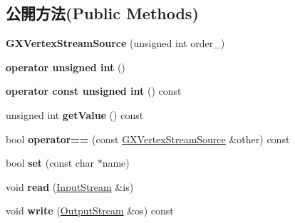\subsection*{公開方法(Public Methods)}
\begin{DoxyCompactItemize}
\item 
{\bfseries G\+X\+Vertex\+Stream\+Source} (unsigned int order\+\_)\hypertarget{class_magnum_1_1_g_x_vertex_stream_source_ad21b3ffb138bf24db534fdd1b831a24e}{}\label{class_magnum_1_1_g_x_vertex_stream_source_ad21b3ffb138bf24db534fdd1b831a24e}

\item 
{\bfseries operator unsigned int} ()\hypertarget{class_magnum_1_1_g_x_vertex_stream_source_a2658fb9c66c733eab735d989b8a0a894}{}\label{class_magnum_1_1_g_x_vertex_stream_source_a2658fb9c66c733eab735d989b8a0a894}

\item 
{\bfseries operator const unsigned int} () const \hypertarget{class_magnum_1_1_g_x_vertex_stream_source_ab23dfffabf2ec96f46dc9e8130c306ba}{}\label{class_magnum_1_1_g_x_vertex_stream_source_ab23dfffabf2ec96f46dc9e8130c306ba}

\item 
unsigned int {\bfseries get\+Value} () const \hypertarget{class_magnum_1_1_g_x_vertex_stream_source_a7d88dcc1f49b5e15d79cbe687d5bbf23}{}\label{class_magnum_1_1_g_x_vertex_stream_source_a7d88dcc1f49b5e15d79cbe687d5bbf23}

\item 
bool {\bfseries operator==} (const \hyperlink{class_magnum_1_1_g_x_vertex_stream_source}{G\+X\+Vertex\+Stream\+Source} \&other) const \hypertarget{class_magnum_1_1_g_x_vertex_stream_source_a9158cc4f04e6cf822fc730899ea591b3}{}\label{class_magnum_1_1_g_x_vertex_stream_source_a9158cc4f04e6cf822fc730899ea591b3}

\item 
bool {\bfseries set} (const char $\ast$name)\hypertarget{class_magnum_1_1_g_x_vertex_stream_source_aaea53f5be155c0e95987893ac47270f3}{}\label{class_magnum_1_1_g_x_vertex_stream_source_aaea53f5be155c0e95987893ac47270f3}

\item 
void {\bfseries read} (\hyperlink{class_magnum_1_1_input_stream}{Input\+Stream} \&is)\hypertarget{class_magnum_1_1_g_x_vertex_stream_source_aebcf790d83840237b0721883a9bd2516}{}\label{class_magnum_1_1_g_x_vertex_stream_source_aebcf790d83840237b0721883a9bd2516}

\item 
void {\bfseries write} (\hyperlink{class_magnum_1_1_output_stream}{Output\+Stream} \&os) const \hypertarget{class_magnum_1_1_g_x_vertex_stream_source_ae4cfe262baa916de31ebe6ba6f0c9329}{}\label{class_magnum_1_1_g_x_vertex_stream_source_ae4cfe262baa916de31ebe6ba6f0c9329}

\end{DoxyCompactItemize}
